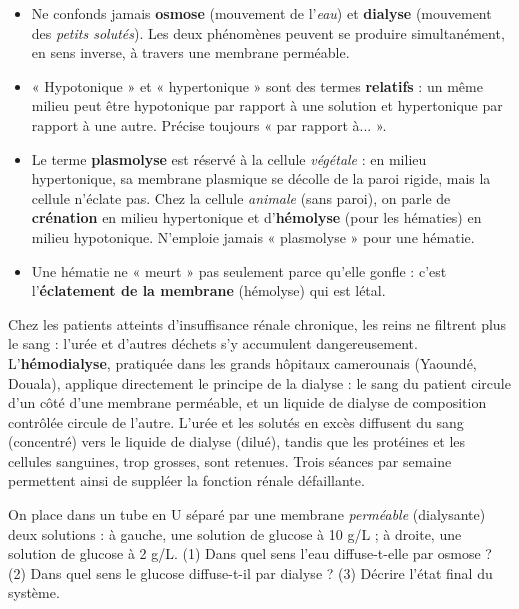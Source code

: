 \documentclass[11pt]{article}
\begin{document}
\begin{attention}
\begin{itemize}
\item Ne confonds jamais \textbf{osmose} (mouvement de l'\emph{eau}) et \textbf{dialyse} (mouvement des \emph{petits solutés}). Les deux phénomènes peuvent se produire simultanément, en sens inverse, à travers une membrane perméable.
\item « Hypotonique » et « hypertonique » sont des termes \textbf{relatifs} : un même milieu peut être hypotonique par rapport à une solution et hypertonique par rapport à une autre. Précise toujours « par rapport à... ».
\item Le terme \textbf{plasmolyse} est réservé à la cellule \emph{végétale} : en milieu hypertonique, sa membrane plasmique se décolle de la paroi rigide, mais la cellule n'éclate pas. Chez la cellule \emph{animale} (sans paroi), on parle de \textbf{crénation} en milieu hypertonique et d'\textbf{hémolyse} (pour les hématies) en milieu hypotonique. N'emploie jamais « plasmolyse » pour une hématie.
\item Une hématie ne « meurt » pas seulement parce qu'elle gonfle : c'est l'\textbf{éclatement de la membrane} (hémolyse) qui est létal.
\end{itemize}
\end{attention}

\begin{savaistu}
Chez les patients atteints d'insuffisance rénale chronique, les reins ne filtrent plus le sang : l'urée et d'autres déchets s'y accumulent dangereusement. L'\textbf{hémodialyse}, pratiquée dans les grands hôpitaux camerounais (Yaoundé, Douala), applique directement le principe de la dialyse : le sang du patient circule d'un côté d'une membrane perméable, et un liquide de dialyse de composition contrôlée circule de l'autre. L'urée et les solutés en excès diffusent du sang (concentré) vers le liquide de dialyse (dilué), tandis que les protéines et les cellules sanguines, trop grosses, sont retenues. Trois séances par semaine permettent ainsi de suppléer la fonction rénale défaillante.
\end{savaistu}

\begin{exercice}
On place dans un tube en U séparé par une membrane \emph{perméable} (dialysante) deux solutions : à gauche, une solution de glucose à 10 g/L ; à droite, une solution de glucose à 2 g/L. (1) Dans quel sens l'eau diffuse-t-elle par osmose ? (2) Dans quel sens le glucose diffuse-t-il par dialyse ? (3) Décrire l'état final du système.
\end{exercice}
\end{document}
